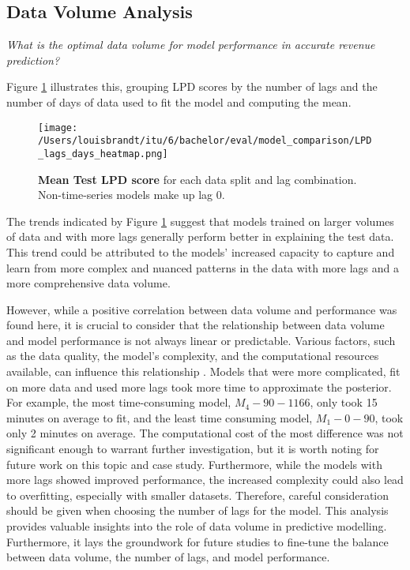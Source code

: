 \subsection{Data Volume Analysis}
\begin{center}
  \textit{What is the optimal data volume for model performance in accurate revenue prediction?}
\end{center}
Figure \ref{fig:lpd_lags_days_heatmap} illustrates this, grouping LPD scores by the 
number of lags and the number of days of data used to fit the model and computing the mean.
\begin{figure}[ht]
  \centering
  \texttt{[image: /Users/louisbrandt/itu/6/bachelor/eval/model\_comparison/LPD\_lags\_days\_heatmap.png]}
  \caption{\textbf{Mean Test LPD score} for each data split and lag combination. Non-time-series models make up lag 0.}
  \label{fig:lpd_lags_days_heatmap}
\end{figure}
The trends indicated by Figure \ref{fig:lpd_lags_days_heatmap} suggest that
models trained on larger volumes of data and with more lags generally perform
better in explaining the test data. This trend could be attributed to the
models' increased capacity to capture and learn from more complex and nuanced
patterns in the data with more lags and a more comprehensive data volume.

However, while a positive correlation between data volume and performance was
found here, it is crucial to consider that the relationship between data volume
and model performance is not always linear or predictable. Various factors, such
as the data quality, the model's complexity, and the computational
resources available, can influence this relationship \cite{statrethinking}.
Models that were more complicated, fit on more data and used more lags took
more time to approximate the posterior. For example, the most time-consuming model,
$M_4{-}90{-}1166$, only took 15 minutes on average to fit, and the least time
consuming model, $M_1{-}0{-}90$, took only 2 minutes on average. The
computational cost of the most difference was not significant enough to warrant
further investigation, but it is worth noting for future work on this topic and
case study.
Furthermore, while the models with more lags showed improved performance, the
increased complexity could also lead to overfitting, especially with smaller
datasets. Therefore, careful consideration should be given when choosing the
number of lags for the model.
This analysis provides valuable insights into the role of data volume in
predictive modelling. Furthermore, it lays the groundwork for future studies to fine-tune
the balance between data volume, the number of lags, and model performance.

